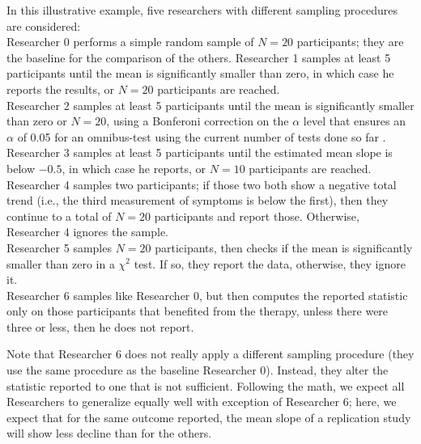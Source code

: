 \documentclass[man]{apa7}
\theoremstyle{definition}
\begin{document}
In this illustrative example, five researchers with different sampling procedures are considered: \\[0.1cm]  %
Researcher 0 performs a simple random sample of $N=20$ participants; they are the baseline for the comparison of the others. 
Researcher 1 samples at least 5 participants until the mean is significantly smaller than zero, in which case he reports the results, or $N=20$ participants are reached. \\
Researcher 2 samples at least 5 participants until the mean is significantly smaller than zero or $N=20$, using a Bonferoni correction on the $\alpha$ level that ensures an $\alpha$ of 0.05 for an omnibus-test using the current number of tests done so far . \\
Researcher 3 samples at least 5 participants until the estimated mean slope is below $-0.5$, in which case he reports, or $N=10$ %
participants are reached.
Researcher 4 samples two participants; if those two both show a negative total trend (i.e., the third measurement of symptoms is below the first), then they continue to a total of $N=20$ participants and report those. Otherwise, Researcher 4 ignores the sample. \\
Researcher 5 samples $N=20$ participants, then checks if the mean is significantly smaller than zero in a $\chi^2$ test. If so, they report the data, otherwise, they ignore it. \\
Researcher 6 samples like Researcher 0, but then computes the reported statistic only on those participants that benefited from the therapy, unless there were three or less, then he does not report. 


Note that Researcher 6 does not really apply a different sampling procedure (they use the same procedure as the baseline Researcher 0).%
Instead, they alter the statistic reported to one that is not sufficient. Following the math, we expect all Researchers to generalize equally well with exception of Researcher 6; here, we expect that for the same outcome reported, the mean slope of a replication study will show less decline than for the others. 
\end{document}
